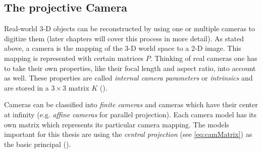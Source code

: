 \subsection{The projective Camera}\label{ssec:projCam}
Real-world 3-D objects can be reconstructed by using one or multiple cameras to digitize them (later chapters will cover this process in more detail). As stated above, a camera is the mapping of the 3-D world space to a 2-D image. This mapping is represented with certain matrices $P$. Thinking of real cameras one has to take their own properties, like their focal length and aspect ratio, into account as well. These properties are called \textit{internal camera parameters} or \textit{intrinsics} and are stored in a $3\times 3$ matrix $K$ (\cite[p.152 et seq.]{Hartley.2011}).

Cameras can be classified into \textit{finite cameras} and cameras which have their center at infinity (e.g. \textit{affine cameras} for parallel projection). Each camera model has its own matrix which represents its particular camera mapping. The models important for this thesis are using the \textit{central projection} (see \autoref{eq:camMatrix}) as the basic principal (\cite[p.153]{Hartley.2011}).

